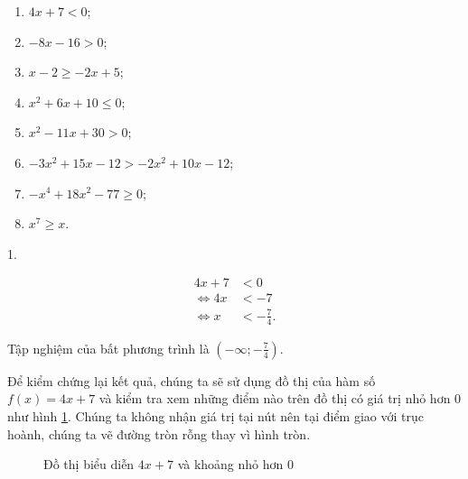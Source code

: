 \begin{multicols}{2}
   \begin{enumerate}
      \item $4x + 7 < 0$;
      \item $-8x - 16 > 0$;
      \item $x - 2 \geq -2x + 5$;
      \item $x^2 + 6x + 10 \leq 0$;
      \item $x^2 - 11x + 30 > 0$;
      \item $-3x^2 + 15x - 12 > -2x^2 + 10x - 12$;
      \item $-x^4 + 18x^2 - 77 \geq 0$;
      \item $x^7 \geq x$.
   \end{enumerate}
\end{multicols}

\solution

{ 
   \begin{minipageindent}{0.55\textwidth}
      1.

      \begin{align*}
         4x + 7 &< 0 \\
         \iff 4x &< -7 \\
         \iff x &< -\frac{7}{4}.
      \end{align*}
      
      Tập nghiệm của bất phương trình là $\displaystyle\left(-\infty; -\frac{7}{4}\right)$.

      Để kiểm chứng lại kết quả, chúng ta sẽ sử dụng đồ thị của hàm số $f(x) = 4x + 7$ và kiểm tra xem những điểm nào trên đồ thị có giá trị nhỏ hơn $0$ như hình \ref{fig:ham_so_mot_bien:da_thuc:gbpt1}. Chúng ta không nhận giá trị tại nút nên tại điểm giao với trục hoành, chúng ta vẽ đường tròn rỗng thay vì hình tròn.
   \end{minipageindent}
   \hfill
   \begin{minipageindent}{0.4\textwidth}
      \begin{figure}[H]
         \centering
         \caption{Đồ thị biểu diễn $4x + 7$ và khoảng nhỏ hơn $0$}
         \label{fig:ham_so_mot_bien:da_thuc:gbpt1}
      \end{figure}
   \end{minipageindent}
}

